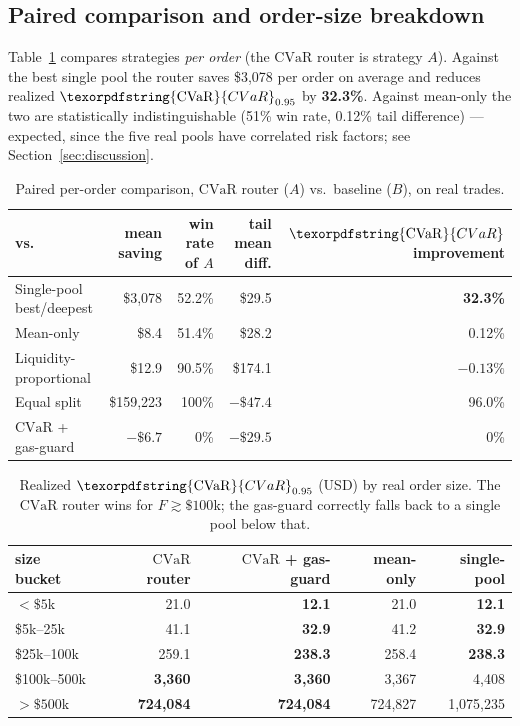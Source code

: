 \documentclass[11pt,a4paper]{article}
\theoremstyle{remark}
\newcommand{\cvar}{\texorpdfstring{\ensuremath{\mathrm{CVaR}}}{CVaR}}
\begin{document}
\subsection{Paired comparison and order-size breakdown}

Table~\ref{tab:paired} compares strategies \emph{per order} (the \cvar{} router is strategy
$A$).  Against the best single pool the router saves \$3{,}078 per order on average and
reduces realized $\cvar_{0.95}$ by \textbf{32.3\%}.  Against mean-only the two are
statistically indistinguishable (51\% win rate, 0.12\% tail difference) --- expected, since
the five real pools have correlated risk factors; see Section~\ref{sec:discussion}.

\begin{table}[H]
\centering
\caption{Paired per-order comparison, \cvar{} router ($A$) vs.\ baseline ($B$), on real
trades.}
\label{tab:paired}
\small
\begin{tabular}{@{}lrrrr@{}}
\toprule
\textbf{vs.} & \textbf{mean saving} & \textbf{win rate of } $A$ & \textbf{tail mean diff.} &
$\cvar$ \textbf{improvement} \\
\midrule
Single-pool best/deepest & \$3{,}078 & 52.2\% & \$29.5 & \textbf{32.3\%} \\
Mean-only & \$8.4 & 51.4\% & \$28.2 & 0.12\% \\
Liquidity-proportional & \$12.9 & 90.5\% & \$174.1 & $-0.13\%$ \\
Equal split & \$159{,}223 & 100\% & $-\$47.4$ & 96.0\% \\
\cvar{} + gas-guard & $-\$6.7$ & 0\% & $-\$29.5$ & 0\% \\
\bottomrule
\end{tabular}
\end{table}

\begin{table}[H]
\centering
\caption{Realized $\cvar_{0.95}$ (USD) by real order size.  The \cvar{} router wins for
$F\gtrsim \$100$k; the gas-guard correctly falls back to a single pool below that.}
\label{tab:by-size}
\small
\begin{tabular}{@{}lrrrr@{}}
\toprule
\textbf{size bucket} & \textbf{\cvar{} router} & \textbf{\cvar{} + gas-guard} &
\textbf{mean-only} & \textbf{single-pool} \\
\midrule
$<\$5$k        & 21.0 & \textbf{12.1} & 21.0 & \textbf{12.1} \\
\$5k--25k       & 41.1 & \textbf{32.9} & 41.2 & \textbf{32.9} \\
\$25k--100k     & 259.1 & \textbf{238.3} & 258.4 & \textbf{238.3} \\
\$100k--500k    & \textbf{3{,}360} & \textbf{3{,}360} & 3{,}367 & 4{,}408 \\
$>\$500$k      & \textbf{724{,}084} & \textbf{724{,}084} & 724{,}827 & 1{,}075{,}235 \\
\bottomrule
\end{tabular}
\end{table}
\end{document}
